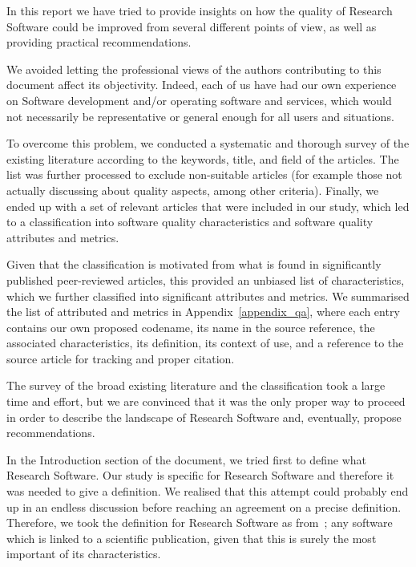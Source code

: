 In this report we have tried to provide insights on how the quality of Research Software could be improved from several different points of view, as well as providing practical recommendations.

We avoided letting the professional views of the authors contributing to this document affect its objectivity. Indeed, each of us have had our own experience on Software development and/or operating software and services, which would not necessarily be representative or general enough for all users and situations.

To overcome this problem, we conducted a systematic and thorough survey of the existing literature according to the keywords, title, and field of the articles. The list was further processed to exclude non-suitable articles (for example those not actually discussing about quality aspects, among other criteria). Finally, we ended up with a set of relevant articles that were included in our study, which led to a classification into software quality characteristics and software quality attributes and metrics. 

Given that the classification is motivated from what is found in significantly published peer-reviewed articles, this provided an unbiased list of characteristics, which we further classified into significant attributes and metrics. We summarised the list of attributed and metrics in Appendix~\ref{appendix_qa}, where each entry contains our own proposed codename, its name in the source reference, the associated characteristics, its definition, its context of use, and a reference to the source article for tracking and proper citation.

The survey of the broad existing literature and the classification took a large time and effort, but we are convinced that it was the only proper way to proceed in order to describe the landscape of Research Software and, eventually, propose recommendations.

In the Introduction section of the document, we tried first to define what Research Software. Our study is specific for Research Software and therefore it was needed to give a definition. We realised that this attempt could probably end up in an endless discussion before reaching an agreement on a precise definition. Therefore, we took the definition for Research Software as from~\cite{gruenpeter_defining_2021}; any software which is linked to a scientific publication, given that this is surely the most important of its characteristics. 

